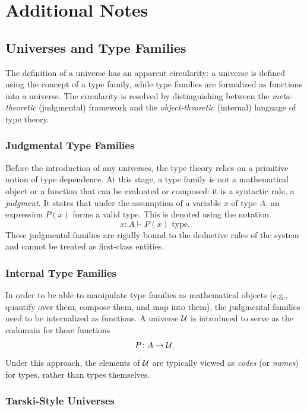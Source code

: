 \chapter{Additional Notes}

\section{Universes and Type Families}\label{universes-and-type-families}

The definition of a universe has an apparent circularity: a universe is defined using the concept of a type family, while type families are formalized as functions into a universe. The circularity is resolved by distinguishing between the \textsl{meta-theoretic} (judgmental) framework and the \textsl{object-theoretic} (internal) language of type theory.

\subsection*{Judgmental Type Families}

Before the introduction of any universes, the type theory relies on a primitive notion of type dependence. At this stage, a type family is not a mathematical object or a function that can be evaluated or composed: it is a syntactic rule, a \textsl{judgment}. It states that under the assumption of a variable $x$ of type $A$, an expression $P(x)$ forms a valid type. This is denoted using the notation
\[
    x\colon A\vdash P(x)\text{ type}.
\]
These judgmental families are rigidly bound to the deductive rules of the system and cannot be treated as first-class entities.

\subsection*{Internal Type Families}

In order to be able to manipulate type families as mathematical objects (e.g., quantify over them, compose them, and map into them), the judgmental families need to be internalized as functions. A universe $\mathcal U$ is introduced to serve as the codomain for these functions
\[
    P\colon A\to\univ.
\]
Under this approach, the elements of $\mathcal U$ are typically viewed as \textsl{codes} (or \textsl{names}) for types, rather than types themselves.

\subsection*{Tarski-Style Universes}

